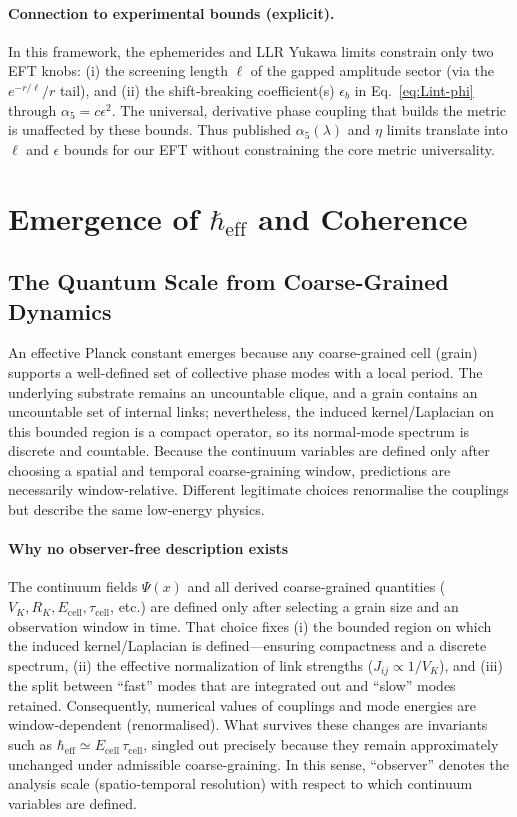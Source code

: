 \documentclass[11pt]{article}
\begin{document}
\paragraph{Connection to experimental bounds (explicit).} In this framework, the ephemerides and LLR Yukawa limits constrain only two EFT knobs: (i) the screening length $\ell$ of the gapped amplitude sector (via the $e^{-r/\ell}/r$ tail), and (ii) the shift‑breaking coefficient(s) $\epsilon_b$ in Eq.~\eqref{eq:Lint-phi} through $\alpha_5=c\epsilon^2$. The universal, derivative phase coupling that builds the metric is unaffected by these bounds. Thus published $\alpha_5(\lambda)$ and $\eta$ limits translate into $\ell$ and $\epsilon$ bounds for our EFT without constraining the core metric universality.


\section{Emergence of $\hbar_{\mathrm{eff}}$ and Coherence}

\subsection{The Quantum Scale from Coarse-Grained Dynamics}

An effective Planck constant emerges because any coarse-grained cell (grain) supports a well-defined set of collective phase modes with a local period. The underlying substrate remains an uncountable clique, and a grain contains an uncountable set of internal links; nevertheless, the induced kernel/Laplacian on this bounded region is a compact operator, so its normal‑mode spectrum is discrete and countable. Because the continuum variables are defined only after choosing a spatial and temporal coarse‑graining window, predictions are necessarily window‑relative. Different legitimate choices renormalise the couplings but describe the same low‑energy physics.

\paragraph{Why no observer‑free description exists} The continuum fields $\Psi(x)$ and all derived coarse‑grained quantities ($V_K, R_K, E_{\text{cell}}, \tau_{\text{cell}}$, etc.) are defined only after selecting a grain size and an observation window in time. That choice fixes (i) the bounded region on which the induced kernel/Laplacian is defined—ensuring compactness and a discrete spectrum, (ii) the effective normalization of link strengths ($J_{ij}\propto 1/V_K$), and (iii) the split between ``fast'' modes that are integrated out and ``slow'' modes retained. Consequently, numerical values of couplings and mode energies are window‑dependent (renormalised). What survives these changes are invariants such as $\hbar_{\mathrm{eff}} \simeq E_{\text{cell}}\,\tau_{\text{cell}}$, singled out precisely because they remain approximately unchanged under admissible coarse‑graining. In this sense, ``observer'' denotes the analysis scale (spatio‑temporal resolution) with respect to which continuum variables are defined.
\end{document}
